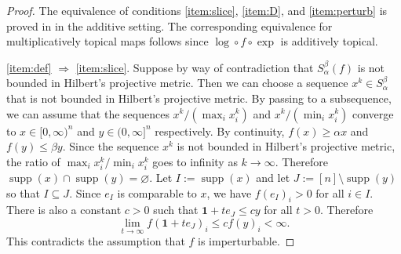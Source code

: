 \documentclass[10pt,reqno]{amsart}
\newcommand{\R}{\mathbb{R}}
\newcommand{\supp}{\operatorname{supp}}
\newcommand{\sign}{\operatorname{sgn}}
\newcommand{\bs}{\setminus}
\theoremstyle{plain}
\theoremstyle{definition}
\numberwithin{equation}{section}
\begin{document}
\begin{proof}
The equivalence of conditions \eqref{item:slice}, \eqref{item:D}, and \eqref{item:perturb} is proved in \cite[Theorem 5.1]{Hochart19} in the additive setting.  The corresponding equivalence for multiplicatively topical maps follows since $\log \circ f \circ \exp$ is additively topical.  

\eqref{item:def} $\Rightarrow$ \eqref{item:slice}. Suppose by way of contradiction that $S_\alpha^\beta(f)$ is not bounded in Hilbert's projective metric.  Then we can choose a sequence $x^k \in S_\alpha^\beta$ that is not bounded in Hilbert's projective metric.  By passing to a subsequence, we can assume that the sequences $x^k/(\max_i x^k_i)$ and $x^k/(\min_i x^k_i)$ converge to $x \in [0,\infty)^n$ and $y \in (0,\infty]^n$ respectively.  By continuity, $f(x) \ge \alpha x$ and $f(y) \le \beta y$.  Since the sequence $x^k$ is not bounded in Hilbert's projective metric, the ratio of $\max_i x^k_i / \min_i x^k_i$ goes to infinity as $k \rightarrow \infty$.  Therefore $\supp(x) \cap \supp(y) = \varnothing$.  Let $I := \supp(x)$ and let $J := [n] \bs \supp(y)$ so that $I \subseteq J$. Since $e_I$ is comparable to $x$, we have $f(e_I)_i > 0$ for all $i \in I$. There is also a constant $c > 0$ such that $\mathbf{1} + t e_J \le c y$ for all $t > 0$. Therefore
$$\lim_{t \rightarrow \infty} f(\mathbf{1} + te_J)_i \le c f(y)_i < \infty.$$
This contradicts the assumption that $f$ is imperturbable.  %




\end{proof}
\end{document}
